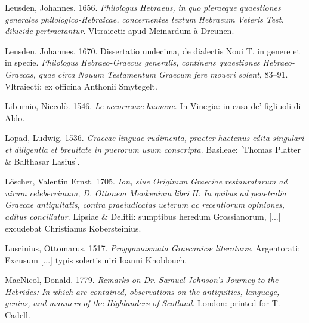 Leusden, Johannes. 1656. \textit{Philologus} \textit{Hebraeus,} \textit{in} \textit{quo} \textit{pleraeque} \textit{quaestiones} \textit{generales} \textit{philologico-Hebraicae,} \textit{concernentes} \textit{textum} \textit{Hebraeum} \textit{Veteris} \textit{Test.} \textit{dilucide} \textit{pertractantur}. Vltraiecti: apud Meinardum à Dreunen.

Leusden, Johannes. 1670. Dissertatio undecima, de dialectis Noui T. in genere et in specie. \textit{Philologus} \textit{Hebraeo-Graecus} \textit{generalis,} \textit{continens} \textit{quaestiones} \textit{Hebraeo-Graecas,} \textit{quae} \textit{circa} \textit{Nouum} \textit{Testamentum} \textit{Graecum} \textit{fere} \textit{moueri} \textit{solent}, 83–91. Vltraiecti: ex officina Anthonii Smytegelt.

Liburnio, Niccolò. 1546. \textit{Le} \textit{occorrenze} \textit{humane}. In Vinegia: in casa de’ figliuoli di Aldo.

Lopad, Ludwig. 1536. \textit{Graecae} \textit{linguae} \textit{rudimenta,} \textit{praeter} \textit{hactenus} \textit{edita} \textit{singulari} \textit{et} \textit{diligentia} \textit{et} \textit{breuitate} \textit{in} \textit{puerorum} \textit{usum} \textit{conscripta}. Basileae: [Thomas Platter \& Balthasar Lasius].

Löscher, Valentin Ernst. 1705. \textit{Ion,} \textit{siue} \textit{Originum} \textit{Graeciae} \textit{restauratarum} \textit{ad} \textit{uirum} \textit{celeberrimum,} \textit{D.} \textit{Ottonem} \textit{Menkenium} \textit{libri} \textit{II:} \textit{In} \textit{quibus} \textit{ad} \textit{penetralia} \textit{Graecae} \textit{antiquitatis,} \textit{contra} \textit{praeiudicatas} \textit{ueterum} \textit{ac} \textit{recentiorum} \textit{opiniones,} \textit{aditus} \textit{conciliatur}. Lipsiae \& Delitii: sumptibus heredum Grossianorum, [...] excudebat Christianus Kobersteinius.

Luscinius, Ottomarus. 1517. \textit{Progymnasmata} \textit{Graecanicæ} \textit{literaturæ}. Argentorati: Excusum [...] typis solertis uiri Ioanni Knoblouch.

MacNicol, Donald. 1779. \textit{Remarks} \textit{on} \textit{Dr.} \textit{Samuel} \textit{Johnson’s} \textit{Journey} \textit{to} \textit{the} \textit{Hebrides:} \textit{In} \textit{which} \textit{are} \textit{contained,} \textit{observations} \textit{on} \textit{the} \textit{antiquities,} \textit{language,} \textit{genius,} \textit{and} \textit{manners} \textit{of} \textit{the} \textit{Highlanders} \textit{of} \textit{Scotland}. London: printed for T. Cadell.

